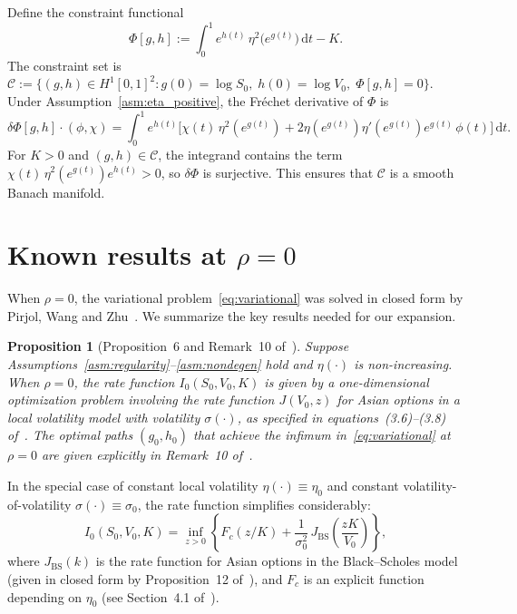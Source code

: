 \documentclass[11pt]{article}
\newtheorem{proposition}[theorem]{Proposition}
\theoremstyle{definition}
\newcommand{\dd}{\mathrm{d}}
\newcommand{\Hone}{H^1}
\begin{document}
Define the constraint functional
\begin{equation}\label{eq:constraint}
  \Phi[g,h] := \int_0^1 e^{h(t)}\,\eta^2\bigl(e^{g(t)}\bigr)\,\dd t - K.
\end{equation}
The constraint set is $\mathcal{C} := \{(g,h) \in \Hone[0,1]^2 : g(0) = \log S_0,\; h(0) = \log V_0,\; \Phi[g,h] = 0\}$. Under Assumption~\ref{asm:eta_positive}, the Fr\'echet derivative of $\Phi$ is
\begin{equation}\label{eq:DPhi}
  \delta\Phi[g,h]\cdot(\phi,\chi) = \int_0^1 e^{h(t)}\bigl[\chi(t)\,\eta^2(e^{g(t)}) + 2\eta(e^{g(t)})\eta'(e^{g(t)})e^{g(t)}\,\phi(t)\bigr]\,\dd t.
\end{equation}
For $K > 0$ and $(g,h) \in \mathcal{C}$, the integrand contains the term $\chi(t)\,\eta^2(e^{g(t)})e^{h(t)} > 0$, so $\delta\Phi$ is surjective. This ensures that $\mathcal{C}$ is a smooth Banach manifold.

\section{Known results at $\rho = 0$}\label{sec:known}

When $\rho = 0$, the variational problem~\eqref{eq:variational} was solved in closed form by Pirjol, Wang and Zhu~\cite{PWZ2025}. We summarize the key results needed for our expansion.

\begin{proposition}[Proposition~6 and Remark~10 of~\cite{PWZ2025}]\label{prop:rho0}
Suppose Assumptions~\ref{asm:regularity}--\ref{asm:nondegen} hold and $\eta(\cdot)$ is non-increasing. When $\rho = 0$, the rate function $I_0(S_0, V_0, K)$ is given by a one-dimensional optimization problem involving the rate function $J(V_0, z)$ for Asian options in a local volatility model with volatility $\sigma(\cdot)$, as specified in equations~(3.6)--(3.8) of~\cite{PWZ2025}. The optimal paths $(g_0, h_0)$ that achieve the infimum in~\eqref{eq:variational} at $\rho = 0$ are given explicitly in Remark~10 of~\cite{PWZ2025}.
\end{proposition}

In the special case of constant local volatility $\eta(\cdot) \equiv \eta_0$ and constant volatility-of-volatility $\sigma(\cdot) \equiv \sigma_0$, the rate function simplifies considerably:
\begin{equation}\label{eq:I0_const}
  I_0(S_0, V_0, K) = \inf_{z > 0}\!\left\{F_c(z/K) + \frac{1}{\sigma_0^2}\,J_{\mathrm{BS}}\!\left(\frac{zK}{V_0}\right)\right\}\!,
\end{equation}
where $J_{\mathrm{BS}}(k)$ is the rate function for Asian options in the Black--Scholes model (given in closed form by Proposition~12 of~\cite{PZ2016}), and $F_c$ is an explicit function depending on $\eta_0$ (see Section~4.1 of~\cite{PWZ2025}).
\end{document}
